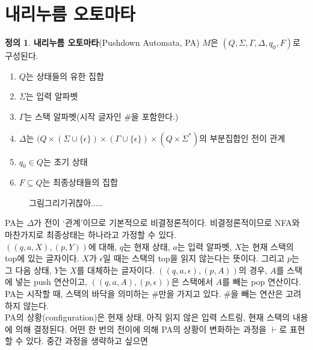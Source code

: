 \documentclass[b5paper]{book}
\theoremstyle{definition}
\newtheorem{defn}{정의}[chapter]
\begin{document}
\section{내리누름 오토마타}
\begin{defn}
    \textbf{내리누름 오토마타}(Pushdown Automata, PA) $M$은 $(Q, \Sigma, 
    \Gamma, \Delta, q_0, F)$로 구성된다. 
    \begin{enumerate}
        \item $Q$는 상태들의 유한 집합
        \item $\Sigma$는 입력 알파벳
        \item $\Gamma$는 스택 알파벳(시작 글자인 \#을 포함한다.)
        \item $\Delta$는 $(Q \times (\Sigma \cup \{\epsilon\}) \times 
        (\Gamma \cup \{\epsilon\}) \times (Q \times \Sigma^*)$의 부분집합인 전이 관계
        \item $q_0 \in Q$는 초기 상태
        \item $F \subseteq Q$는 최종상태들의 집합
    \end{enumerate}
\end{defn}
\begin{figure}[!ht]
    \centering
    \caption{그림그리기귀찮아.....}
\end{figure}
PA는 $\Delta$가 전이 `관계'이므로 기본적으로 비결정론적이다. 비결정론적이므로 NFA와 마찬가지로
최종상태는 하나라고 가정할 수 있다. \\ 
$((q, a, X), (p, Y))$에 대해, $q$는 현재 상태, $a$는 입력 알파벳, $X$는 현재 스택의 
top에 있는 글자이다. $X$가 $\epsilon$일 때는 스택의 top을 읽지 않는다는 뜻이다. 
그리고 $p$는 그 다음 상태, $Y$는 $X$를 대체하는 글자이다. $((q,a,\epsilon),(p,A))$의 경우,
$A$를 스택에 넣는 push 연산이고, $((q,a,A),(p,\epsilon))$은 스택에서 $A$를 빼는 pop 연산이다. \\ 
PA는 시작할 때, 스택의 바닥을 의미하는 \#만을 가지고 있다. \#을 빼는 연산은 고려하지 않는다. \\ 
PA의 상황(configuration)은 현재 상태, 아직 읽지 않은 입력 스트링, 현재 스택의 내용에 의해 결정된다.
어떤 한 번의 전이에 의해 PA의 상황이 변화하는 과정을 $\vdash$로 표현할 수 있다. 중간 과정을 생략하고 싶으면
\end{document}
